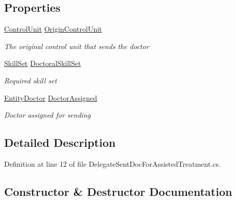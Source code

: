 \subsection*{Properties}
\begin{DoxyCompactItemize}
\item 
\hyperlink{class_simulation_core_1_1_h_c_c_m_elements_1_1_control_unit}{Control\+Unit} \hyperlink{class_general_health_care_elements_1_1_delegates_1_1_delegate_sent_doc_for_assisted_treatment_a4eda5540ec17cbe345ad46240ebbef93}{Origin\+Control\+Unit}
\begin{DoxyCompactList}\small\item\em The original control unit that sends the doctor \end{DoxyCompactList}\item 
\hyperlink{class_simulation_core_1_1_h_c_c_m_elements_1_1_skill_set}{Skill\+Set} \hyperlink{class_general_health_care_elements_1_1_delegates_1_1_delegate_sent_doc_for_assisted_treatment_aa125a141115053aa04e3376035e351ca}{Doctoral\+Skill\+Set}
\begin{DoxyCompactList}\small\item\em Required skill set \end{DoxyCompactList}\item 
\hyperlink{class_general_health_care_elements_1_1_entities_1_1_entity_doctor}{Entity\+Doctor} \hyperlink{class_general_health_care_elements_1_1_delegates_1_1_delegate_sent_doc_for_assisted_treatment_a11e1c851c50452071a5420af05dad2ac}{Doctor\+Assigned}
\begin{DoxyCompactList}\small\item\em Doctor assigned for sending \end{DoxyCompactList}\end{DoxyCompactItemize}


\subsection{Detailed Description}


Definition at line 12 of file Delegate\+Sent\+Doc\+For\+Assisted\+Treatment.\+cs.



\subsection{Constructor \& Destructor Documentation}
